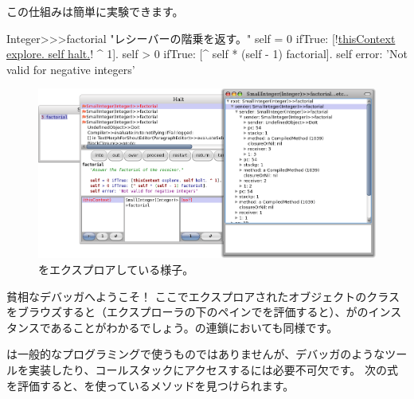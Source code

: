 \documentclass[a4paper,10pt,twoside]{book}
\begin{document}
この仕組みは簡単に実験できます。


\begin{code}{}
Integer>>>factorial
	"レシーバーの階乗を返す。"
	self = 0 ifTrue: [!\underline{thisContext explore. self halt.}! ^ 1].
	self > 0 ifTrue: [^ self * (self - 1) factorial].
	self error: 'Not valid for negative integers'
\end{code}


\begin{figure}[ht]\centering
	\includegraphics[width=\linewidth]{exploringThisContext}
	\caption{をエクスプロアしている様子。}
\end{figure}

貧相なデバッガへようこそ！
ここでエクスプロアされたオブジェクトのクラスをブラウズすると（\ie エクスプローラの下のペインでを評価すると）、がのインスタンスであることがわかるでしょう。の連鎖においても同様です。

は一般的なプログラミングで使うものではありませんが、デバッガのようなツールを実装したり、コールスタックにアクセスするには必要不可欠です。
次の式を評価すると、を使っているメソッドを見つけられます。
\end{document}
